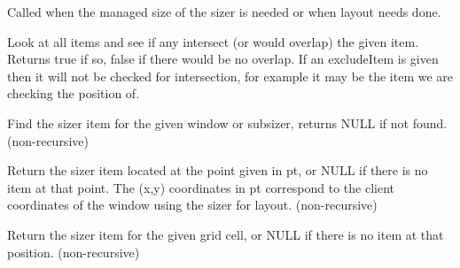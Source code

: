 \label{wxgridbagsizercalcmin}


Called when the managed size of the sizer is needed or when layout
needs done.

\label{wxgridbagsizercheckforintersection}



Look at all items and see if any intersect (or would overlap) the given
item. Returns true if so, false if there would be no overlap. If an
excludeItem is given then it will not be checked for intersection, for
example it may be the item we are checking the position of.

\label{wxgridbagsizerfinditem}



Find the sizer item for the given window or subsizer, returns NULL if
not found. (non-recursive)

\label{wxgridbagsizerfinditematpoint}


Return the sizer item located at the point given in pt, or NULL if
there is no item at that point. The (x,y) coordinates in pt correspond
to the client coordinates of the window using the sizer for
layout. (non-recursive)

\label{wxgridbagsizerfinditematposition}


Return the sizer item for the given grid cell, or NULL if there is no
item at that position. (non-recursive)

\label{wxgridbagsizerfinditemwithdata}



